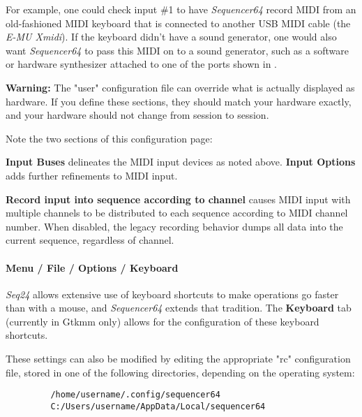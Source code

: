    For example, one could check input \#1 to have \textsl{Sequencer64} record
   MIDI from an old-fashioned MIDI keyboard that is connected to another
   USB MIDI cable (the \textsl{E-MU Xmidi}).  If the keyboard didn't have a
   sound generator, one would also want \textsl{Sequencer64} to pass this MIDI
   on to a sound generator, such as a software or hardware synthesizer attached
   to one of the ports shown in
   .

   \textbf{Warning:}
   The "user" configuration file can override what is actually
   displayed as hardware.  If you define these sections, they should match your
   hardware exactly, and your hardware should not change from session to
   session.

   Note the two sections of this configuration page:

   \textbf{Input Buses} delineates the MIDI input devices as noted above.
   \textbf{Input Options} adds further refinements to MIDI input.

   \textbf{Record input into sequence according to channel}
   causes MIDI input with multiple channels to be distributed to
   each sequence according to MIDI channel number.
   When disabled, the legacy recording behavior dumps all data into the current
   sequence, regardless of channel.


\paragraph{Menu / File / Options / Keyboard }
\label{paragraph:seq64_menu_file_options_keyboard}

   \textsl{Seq24} allows extensive use of
   keyboard shortcuts to make operations go faster than with a mouse,
   and \textsl{Sequencer64} extends that tradition.
   The \textbf{Keyboard} tab (currently in Gtkmm only)
   allows for the configuration of these keyboard shortcuts.

   These settings can also be modified by editing the appropriate "rc"
   configuration file, stored in one of the following directories, depending on
   the operating system:
   
   \begin{verbatim}
         /home/username/.config/sequencer64
         C:/Users/username/AppData/Local/sequencer64
   \end{verbatim}

